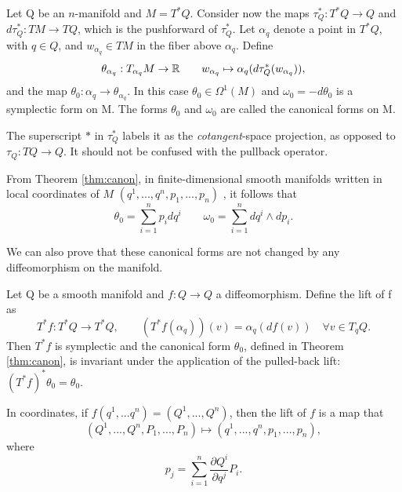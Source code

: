 \begin{theorem}\label{thm:canon}
	Let Q be an $n$-manifold and $M = T^*Q$. Consider now the maps $\tau^*_Q: T^*Q \to Q$ and $d\tau^*_Q: TM \to TQ$, which is the pushforward of $\tau^*_Q$. Let $\alpha_q$ denote a point in $T^*Q$, with $q \in Q$, and $w_{\alpha_q} \in TM$ in the fiber above $\alpha_q$. Define
	\[
		\theta_{\alpha_q} : T_{\alpha_q}M \to \mathbb{R} \qquad w_{\alpha_q} \mapsto \alpha_q(d \tau^*_Q(w_{\alpha_q})),
	\] 
	and the map $\theta_0: \alpha_q \to \theta_{\alpha_q}$. In this case $\theta_0 \in \Omega^1(M)$ and $\omega_0=-d\theta_0$ is a symplectic form on M. The forms $\theta_0$ and $\omega_0$ are called the canonical forms on M.
\end{theorem}

\begin{remark}
	The superscript $*$ in $\tau^*_Q$ labels it as the \emph{cotangent}-space projection, as opposed to $\tau_Q: TQ \to Q$. It should not be confused with the pullback operator. 
\end{remark}

\begin{corollary}\label{crl:canon-coord}
	From Theorem \ref{thm:canon}, in finite-dimensional smooth manifolds written in local coordinates of $M$ $(q^1,...,q^n,p_1,...,p_n)$ , it follows that
	\[
		\theta_0 = \sum_{i=1}^n p_i dq^i \qquad \omega_0 = \sum_{i=1}^n dq^i \wedge dp_i.
	\]
\end{corollary}

\noindent We can also prove that these canonical forms are not changed by any diffeomorphism on the manifold.
\begin{theorem}\label{thm:inv-canon}
	Let Q be a smooth manifold and $f: Q \to Q$ a diffeomorphism. Define the lift of f as
	\[
		T^*f : T^*Q \to T^*Q, \qquad (T^*f(\alpha_q))(v) = \alpha_q(df(v)) \quad \forall v \in T_qQ.
	\]
	Then $T^*f$ is symplectic and the canonical form $\theta_0$, defined in Theorem \ref{thm:canon}, is invariant under the application of the pulled-back lift:  $(T^*f)^*\theta_0 = \theta_0$.
\end{theorem}

\begin{remark}
	In coordinates, if $f(q^1,...q^n) = (Q^1,...,Q^n)$, then the lift of $f$ is a map that 
	\[
		(Q^1,...,Q^n, P_1,...,P_n) \mapsto (q^1,...,q^n, p_1,...,p_n),
	\] 
	where
	\[
		p_j = \sum_{i=1}^n \frac{\partial Q^i}{\partial q^j} P_i.
	\]
\end{remark}


\printbibliography


